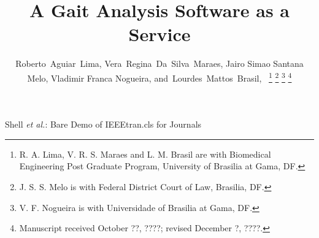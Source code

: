 \documentclass[journal]{IEEEtran}
\begin{document}
%
\title{A Gait Analysis Software as a Service}
%
%
%

\author{
	Roberto~Aguiar~Lima,
	Vera~Regina~Da~Silva~Maraes,
	Jairo Simao Santana Melo,
	Vladimir Franca Nogueira,
        and~Lourdes~Mattos~Brasil,~
	\thanks{R. A. Lima, V. R. S. Maraes and L. M. Brasil are with Biomedical Engineering Post Graduate Program, University of Brasilia at Gama, DF.}
	\thanks{J. S. S. Melo is with Federal District Court of Law, Brasilia, DF.}
	\thanks{V. F. Nogueira is with Universidade of Brasilia at Gama, DF.}
	\thanks{Manuscript received October ??, ????; revised December ?, ????.}
}


% 
%



%
{Shell \MakeLowercase{\textit{et al.}}: Bare Demo of IEEEtran.cls for Journals}
% 
\end{document}

